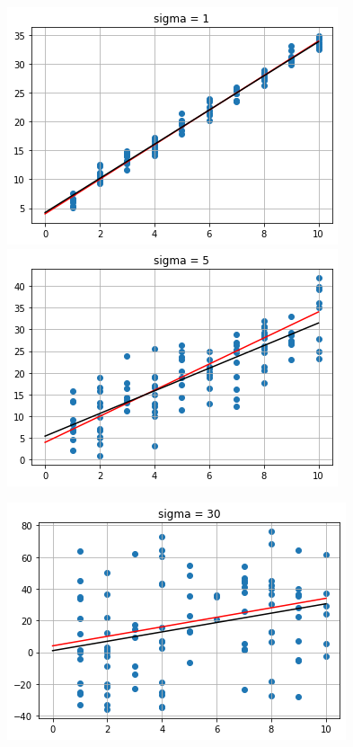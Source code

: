 \documentclass[11pt]{article}
\begin{document}
\begin{enumerate}
            \begin{minipage}[t]{0.48\linewidth}
                \begin{center}
                    \includegraphics[width=\linewidth]{sr1.png}
                    \includegraphics[width=\linewidth]{sr5.png}
                \end{center}
            \end{minipage}
            \begin{center}
                \includegraphics[width=0.54\linewidth]{sr30.png}

\end{center}
\end{enumerate}
\end{document}
